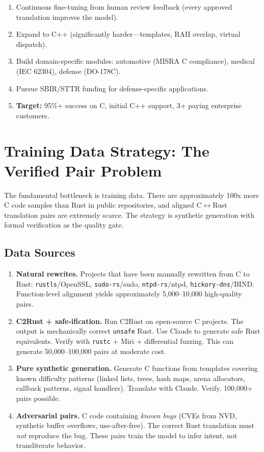 \documentclass[11pt,a4paper]{article}
\theoremstyle{definition}
\theoremstyle{remark}
\begin{document}
\begin{enumerate}[leftmargin=2em]
\item Continuous fine-tuning from human review feedback (every approved translation improves the model).
\item Expand to C++ (significantly harder---templates, RAII overlap, virtual dispatch).
\item Build domain-specific modules: automotive (MISRA C compliance), medical (IEC 62304), defense (DO-178C).
\item Pursue SBIR/STTR funding for defense-specific applications.
\item \textbf{Target:} 95\%+ success on C, initial C++ support, 3+ paying enterprise customers.
\end{enumerate}


\section{Training Data Strategy: The Verified Pair Problem}

The fundamental bottleneck is training data. There are approximately 100x more C code samples than Rust in public repositories, and aligned C$\leftrightarrow$Rust translation pairs are extremely scarce. The strategy is synthetic generation with formal verification as the quality gate.

\subsection{Data Sources}

\begin{enumerate}[leftmargin=2em]
\item \textbf{Natural rewrites.} Projects that have been manually rewritten from C to Rust: \texttt{rustls}/OpenSSL, \texttt{sudo-rs}/sudo, \texttt{ntpd-rs}/ntpd, \texttt{hickory-dns}/BIND. Function-level alignment yields approximately 5,000--10,000 high-quality pairs.

\item \textbf{C2Rust + safe-ification.} Run C2Rust on open-source C projects. The output is mechanically correct \texttt{unsafe} Rust. Use Claude to generate safe Rust equivalents. Verify with \texttt{rustc} + Miri + differential fuzzing. This can generate 50,000--100,000 pairs at moderate cost.

\item \textbf{Pure synthetic generation.} Generate C functions from templates covering known difficulty patterns (linked lists, trees, hash maps, arena allocators, callback patterns, signal handlers). Translate with Claude. Verify. 100,000+ pairs possible.

\item \textbf{Adversarial pairs.} C code containing \textit{known bugs} (CVEs from NVD, synthetic buffer overflows, use-after-free). The correct Rust translation must \textit{not} reproduce the bug. These pairs train the model to infer intent, not transliterate behavior.
\end{enumerate}
\end{document}
